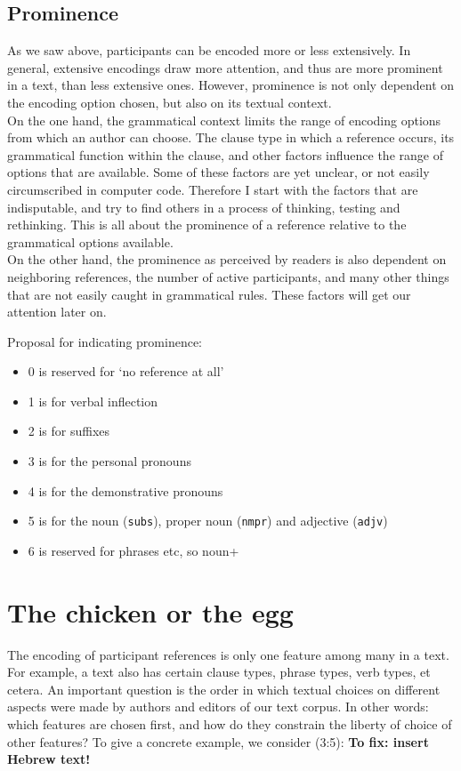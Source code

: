 \documentclass{report}
\newcommand{\mi}[1]{\lstinline{#1}}
\begin{document}
\subsection{Prominence}
As we saw above, participants can be encoded more or less extensively. In general, extensive encodings draw more attention, and thus are more prominent in a text, than less extensive ones. However, prominence is not only dependent on the encoding option chosen, but also on its textual context.\\
On the one hand, the grammatical context limits the range of encoding options from which an author can choose. The clause type in which a reference occurs, its grammatical function within the clause, and other factors influence the range of options that are available. Some of these factors are yet unclear, or not easily circumscribed in computer code. Therefore I start with the factors that are indisputable, and try to find others in a process of thinking, testing and rethinking. This is all about the prominence of a reference relative to the grammatical options available.\\
On the other hand, the prominence as perceived by readers is also dependent on neighboring references, the number of active participants, and many other things that are not easily caught in grammatical rules. These factors will get our attention later on.

Proposal for indicating prominence:
\begin{itemize}
\item 0 is reserved for `no reference at all'
\item 1 is for verbal inflection
\item 2 is for suffixes
\item 3 is for the personal pronouns
\item 4 is for the demonstrative pronouns
\item 5 is for the noun (\mi{subs}), proper noun (\mi{nmpr}) and adjective (\mi{adjv})
\item 6 is reserved for phrases etc, so noun+
\end{itemize}

\section{The chicken or the egg}
The encoding of participant references is only one feature among many in a text. For example, a text also has certain clause types, phrase types, verb types, et cetera.
An important question is the order in which textual choices on different aspects were made by authors and editors of our text corpus. In other words: which features are chosen first, and how do they constrain the liberty of choice of other features?
To give a concrete example, we consider (3:5): \textbf{To fix: insert Hebrew text!}
\end{document}
